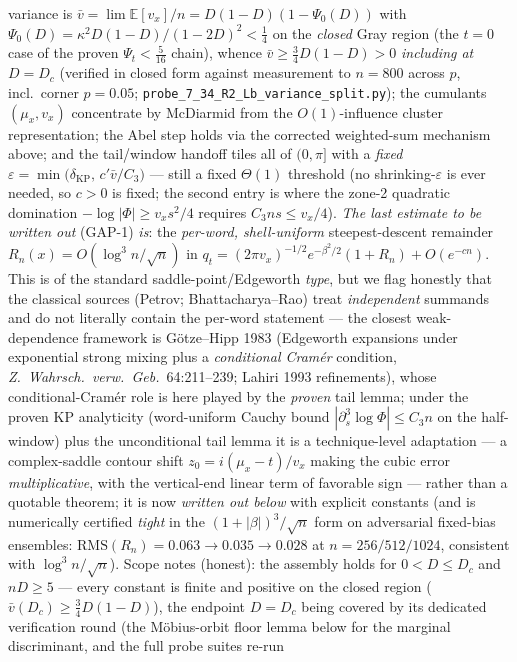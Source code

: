 \documentclass[
]{article}
\begin{document}
variance is $\bar v=\lim\mathbb E[v_x]/n=D(1-D)(1-\Psi_0(D))$ with
$\Psi_0(D)=\kappa^2D(1-D)/(1-2D)^2<\tfrac14$ on the \emph{closed} Gray region (the $t=0$ case of the
proven $\Psi_t<\tfrac5{16}$ chain), whence $\bar v\ge\tfrac34D(1-D)>0$ \emph{including at} $D=D_c$
(verified in closed form against measurement to $n=800$ across $p$, incl.\ corner $p=0.05$;
\texttt{probe\_7\_34\_R2\_Lb\_variance\_split.py}); the cumulants $(\mu_x,v_x)$ concentrate by
McDiarmid from the $O(1)$-influence cluster representation; the Abel step holds via the corrected
weighted-sum mechanism above; and the tail/window handoff tiles all of $(0,\pi]$ with a \emph{fixed}
$\varepsilon=\min\bigl(\delta_{\mathrm{KP}},\,c'\bar v/C_3\bigr)$ --- still a fixed $\Theta(1)$
threshold (no shrinking-$\varepsilon$ is ever needed, so $c>0$ is fixed; the second entry is where the
zone-2 quadratic domination $-\log|\Phi|\ge v_xs^2/4$ requires $C_3ns\le v_x/4$).
\emph{The last estimate to be written out} (GAP-1) \emph{is}: the \emph{per-word, shell-uniform}
steepest-descent remainder $R_n(x)=O(\log^3n/\sqrt n)$ in $q_t=(2\pi v_x)^{-1/2}e^{-\beta^2/2}(1+R_n)
+O(e^{-cn})$. This is of the standard saddle-point/Edgeworth \emph{type}, but we flag honestly that the
classical sources (Petrov; Bhattacharya--Rao) treat \emph{independent} summands and do not literally
contain the per-word statement --- the closest weak-dependence framework is G\"otze--Hipp 1983
(Edgeworth expansions under exponential strong mixing plus a \emph{conditional Cram\'er} condition,
\emph{Z.\ Wahrsch.\ verw.\ Geb.}\ 64:211--239; Lahiri 1993 refinements), whose conditional-Cram\'er
role is here played by the \emph{proven} tail lemma; under the proven KP analyticity (word-uniform Cauchy bound
$|\partial_s^3\log\Phi|\le C_3n$ on the half-window) plus the unconditional tail lemma it is a
technique-level adaptation --- a complex-saddle contour shift $z_0=i(\mu_x-t)/v_x$ making the cubic
error \emph{multiplicative}, with the vertical-end linear term of favorable sign --- rather than a
quotable theorem; it is now \emph{written out below} with explicit constants (and is numerically
certified \emph{tight} in the $(1+|\beta|)^3/\sqrt n$ form on adversarial fixed-bias ensembles:
$\mathrm{RMS}(R_n)=0.063\to0.035\to0.028$ at $n=256/512/1024$, consistent with $\log^3n/\sqrt n$). Scope notes (honest): the assembly holds for
$0<D\le D_c$ and $nD\ge5$ --- every constant is finite and positive on the closed region ($\bar
v(D_c)\ge\tfrac34D(1-D)$), the endpoint $D=D_c$ being covered by its dedicated verification round
(the M\"obius-orbit floor lemma below for the marginal discriminant, and the full probe suites re-run
\end{document}
